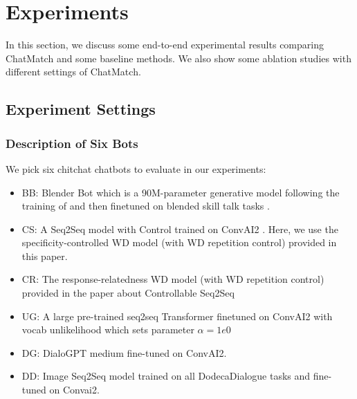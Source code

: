 \section{Experiments}
\label{sec:experiment}
In this section, we discuss some end-to-end experimental results 
comparing ChatMatch and some baseline methods. 
We also show some ablation studies with different settings of 
ChatMatch.

\subsection{Experiment Settings}

\subsubsection*{Description of Six Bots} 
We pick six chitchat chatbots to evaluate in our experiments:
\begin{itemize}
\item BB: Blender Bot \citep{roller2020recipes} which is a 
90M-parameter generative model following the training 
of \citet{shuster2020dialogue} and then finetuned on 
blended skill talk tasks \cite{smith2020together}.

\item CS: A Seq2Seq model with Control \citep{see2019makes} trained on ConvAI2 \citep{dinan2019second}. Here, we use the 
specificity-controlled WD model (with WD repetition control) 
provided in this paper.
\item CR: The response-relatedness WD model 
(with WD repetition control) provided in the paper about 
Controllable Seq2Seq \citep{see2019makes}
\item UG: A large pre-trained seq2seq Transformer finetuned on ConvAI2 
with vocab unlikelihood which sets parameter 
$\alpha =1e0$ \citep{li2020dont}
\item DG: DialoGPT medium \citep{zhang2020dialogpt} fine-tuned 
on ConvAI2. 
\item DD: Image Seq2Seq model trained on all DodecaDialogue tasks 
and fine-tuned on Convai2. \citep{shuster2020dialogue}
\end{itemize}
 
